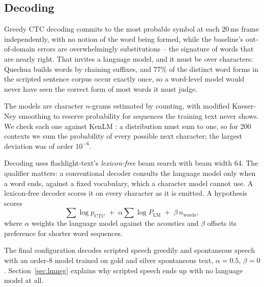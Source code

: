 \subsection{Decoding}

Greedy CTC decoding commits to the most probable symbol at each 20\,ms frame
independently, with no notion of the word being formed, while the baseline's
out-of-domain errors are overwhelmingly substitutions -- the signature of words
that are nearly right. That invites a language model, and it must be over
characters: Quechua builds words by chaining suffixes, and 77\% of the distinct
word forms in the scripted sentence corpus occur exactly once, so a word-level
model would never have seen the correct form of most words it must judge.

The models are character $n$-grams estimated by counting, with modified
Kneser-Ney smoothing \cite{chen1996smoothing} to reserve probability for
sequences the training text never shows. We check each one against KenLM
\cite{heafield2011kenlm}: a distribution must sum to one, so for 200 contexts
we sum the probability of every possible next character; the largest deviation
was of order $10^{-6}$.

Decoding uses flashlight-text's \emph{lexicon-free} beam search
\cite{kahn2022flashlight} with beam width 64. The qualifier matters: a
conventional decoder consults the language model only when a word ends, against
a fixed vocabulary, which a character model cannot use. A lexicon-free decoder
scores it on every character as it is emitted. A hypothesis scores
\begin{equation}
\sum \log p_{\text{CTC}}
\;+\; \alpha \sum \log P_{\text{LM}}
\;+\; \beta\,n_{\text{words}},
\label{eq:score}
\end{equation}
where $\alpha$ weights the language model against the acoustics and $\beta$
offsets its preference for shorter word sequences.

The final configuration decodes scripted speech greedily and spontaneous speech
with an order-8 model trained on gold and silver spontaneous text,
$\alpha = 0.5$, $\beta = 0$. Section~\ref{sec:lmneg} explains why scripted
speech ends up with no language model at all.
